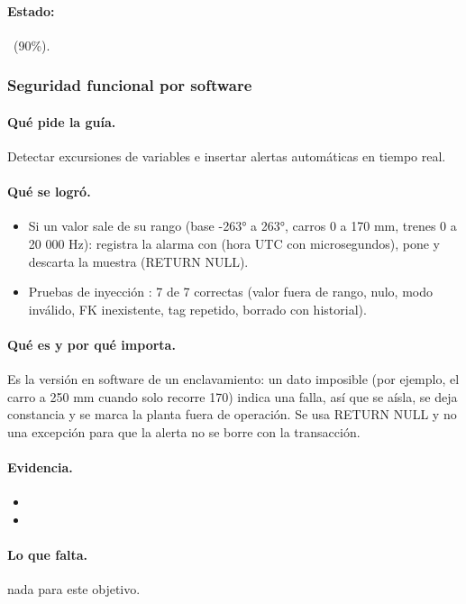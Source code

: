\documentclass[a4paper,11pt]{article}
\begin{document}
\paragraph{Estado:} \parcial~(90\%).
\subsubsection{Seguridad funcional por software}
\paragraph{Qué pide la guía.} Detectar excursiones de variables e insertar alertas automáticas en tiempo real.
\paragraph{Qué se logró.}
\begin{itemize}
\item Si un valor sale de su rango (base -263° a 263°, carros 0 a 170 mm, trenes 0 a 20 000 Hz): registra la alarma  con  (hora UTC con microsegundos), pone  y descarta la muestra (RETURN NULL).
\item Pruebas de inyección : 7 de 7 correctas (valor fuera de rango, nulo, modo inválido, FK inexistente, tag repetido, borrado con historial).
\end{itemize}
\paragraph{Qué es y por qué importa.} Es la versión en software de un enclavamiento: un dato imposible (por ejemplo, el carro a 250 mm cuando solo recorre 170) indica una falla, así que se aísla, se deja constancia y se marca la planta fuera de operación. Se usa RETURN NULL y no una excepción para que la alerta no se borre con la transacción.
\paragraph{Evidencia.}
\begin{itemize}\small
\item {}
\item {}
\end{itemize}
\paragraph{Lo que falta.} nada para este objetivo.
\end{document}
